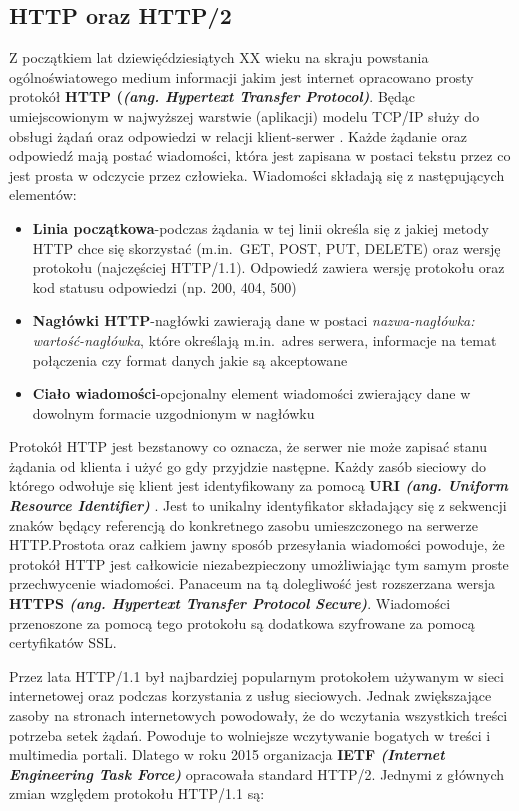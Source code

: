 \subsection{HTTP oraz HTTP/2}
Z początkiem lat dziewięćdziesiątych XX wieku na skraju powstania ogólnoświatowego medium informacji jakim jest internet opracowano prosty protokół \textbf{HTTP (\textit{(ang. Hypertext Transfer Protocol)}}. Będąc umiejscowionym w najwyższej warstwie (aplikacji) modelu TCP/IP służy do obsługi żądań oraz odpowiedzi w relacji klient-serwer \cite{gourley2002http}. Każde żądanie oraz odpowiedź mają postać wiadomości, która jest zapisana w postaci tekstu przez co jest prosta w odczycie przez człowieka. Wiadomości składają się z następujących elementów:
\begin{itemize}
    \item  \textbf{Linia początkowa}-podczas żądania w tej linii określa się z jakiej metody HTTP chce się skorzystać (m.in.\ GET, POST, PUT, DELETE) oraz wersję protokołu (najczęściej HTTP/1.1). Odpowiedź zawiera wersję protokołu oraz kod statusu odpowiedzi (np. 200, 404, 500)
    \item  \textbf{Nagłówki HTTP}-nagłówki zawierają dane w postaci \textit{nazwa-nagłówka: wartość-nagłówka}, które określają m.in.\ adres serwera, informacje na temat połączenia czy format danych jakie są akceptowane \cite{gourley2002http}
    \item \textbf{Ciało wiadomości}-opcjonalny element wiadomości zwierający dane w dowolnym formacie uzgodnionym w nagłówku 
\end{itemize}
Protokół HTTP jest bezstanowy co oznacza, że serwer nie może zapisać stanu żądania od klienta i użyć go gdy przyjdzie następne. Każdy zasób sieciowy do którego odwołuje się klient jest identyfikowany za pomocą \textbf{URI \textit{(ang. Uniform Resource Identifier)}} \cite{berners2014rfc}. Jest to unikalny identyfikator składający się z sekwencji znaków będący referencją do konkretnego zasobu umieszczonego na serwerze HTTP.\@ Prostota oraz całkiem jawny sposób przesyłania wiadomości powoduje, że protokół HTTP jest całkowicie niezabezpieczony umożliwiając tym samym proste przechwycenie wiadomości. Panaceum na tą dolegliwość jest rozszerzana wersja \textbf{HTTPS \textit{(ang. Hypertext Transfer Protocol Secure)}}. Wiadomości przenoszone za pomocą tego protokołu są dodatkowa szyfrowane za pomocą certyfikatów SSL.\@
\par Przez lata HTTP/1.1 był najbardziej popularnym protokołem używanym w sieci internetowej oraz podczas korzystania z usług sieciowych. Jednak zwiększające zasoby na stronach internetowych powodowały, że do wczytania wszystkich treści potrzeba setek żądań. Powoduje to wolniejsze wczytywanie bogatych w treści i multimedia portali. Dlatego w roku 2015 organizacja \textbf{IETF \textit{(Internet Engineering Task Force)}} opracowała standard HTTP/2\cite{belshe2015hypertext}. Jednymi z głównych zmian względem protokołu HTTP/1.1 są:
